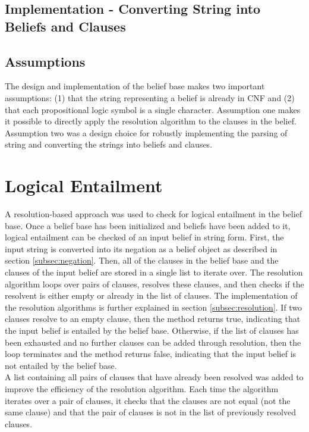 \documentclass[a4paper,10pt]{article}
\begin{document}
\subsection{Implementation - Converting String into Beliefs and Clauses}
\label{subsec:implementation}

\subsection{Assumptions}
\label{subsec:assumptions}
The design and implementation of the belief base makes two important assumptions: (1) that the string representing a belief is already in CNF and (2) that
each propositional logic symbol is a single character. Assumption one makes it possible to directly apply the resolution algorithm to the clauses in the belief.
Assumption two was a design choice for robustly implementing the parsing of string and converting the strings into beliefs and clauses.

\section{Logical Entailment}
\label{sec:entail}
A resolution-based approach was used to check for logical entailment in the belief base. Once a belief base has been initialized and beliefs have been added
to it, logical entailment can be checked of an input belief in string form. First, the input string is converted into its negation as a belief object as described
in section \ref{subsec:negation}. Then, all of the clauses in the belief base and the clauses of the input belief are stored in a single list to iterate over. The
resolution algorithm loops over pairs of clauses, resolves these clauses, and then checks if the resolvent is either empty or already in the list of clauses.
The implementation of the resolution algorithms is further explained in section \ref{subsec:resolution}. If two clauses resolve to an empty clause,
then the method returns true, indicating that the input belief is entailed by the belief base. Otherwise, if the list of clauses has been exhausted and no further
clauses can be added through resolution, then the loop terminates and the method returns false, indicating that the input belief is not entailed by the belief
base. \\

A list containing all pairs of clauses that have already been resolved was added to improve the efficiency of the resolution algorithm. Each time the algorithm
iterates over a pair of clauses, it checks that the clauses are not equal (not the same clause) and that the pair of clauses is not in the list of previously
resolved clauses. \\
\end{document}
